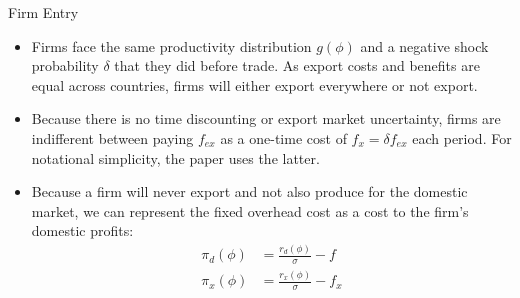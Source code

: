\documentclass[aspectratio=169]{beamer}
\begin{document}
\begin{frame}{Firm Entry}

\begin{itemize}
    \item<1-> Firms face the same productivity distribution $ g\left( \phi \right) $ and a negative shock probability $ \delta $ that they did before trade.  As export costs and benefits are equal across countries, firms will either export everywhere or not export.
    \item<2-> Because there is no time discounting or export market uncertainty, firms are indifferent between paying $ f_{ex} $ as a one-time cost of $ f_{x} = \delta f_{ex} $ each period.  For notational simplicity, the paper uses the latter.
    \item<3-> Because a firm will never export and not also produce for the domestic market, we can represent the fixed overhead cost as a cost to the firm’s domestic profits:
    \begin{equation*}
        \begin{split}
            \pi_{d}\left( \phi \right) &= \frac{r_{d}\left( \phi \right)}{\sigma} - f \\
            \pi_{x}\left( \phi \right) &= \frac{r_{x}\left( \phi \right)}{\sigma} - f_{x}
        \end{split}
    \end{equation*}
\end{itemize}
    
\end{frame}

\end{document}
